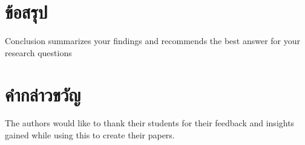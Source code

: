 \documentclass[10pt,twocolumn,twoside,a4paper]{article}
\begin{document}
\section{ข้อสรุป}
\label{conclusion}
Conclusion summarizes your findings and recommends the best answer for your research questions

\section*{คำกล่าวขวัญ}
\label{Acknowledgment}
The authors would like to thank their students for their feedback and insights gained while using this to create their papers.



\vfill
\end{document}
